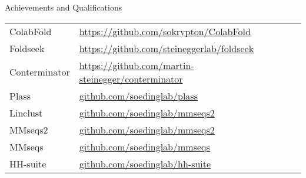 \documentclass{resume} %
\newenvironment{packed_itemize}{
\begin{itemize}
  \setlength{\itemsep}{3pt}
  \setlength{\parskip}{0pt}
  \setlength{\parsep}{0pt}
}{\end{itemize}}
\begin{document}
\begin{rSection}{Achievements and Qualifications}
\begin{tabular}{p{2.5cm}p{14.1cm}}
ColabFold  & \url{https://github.com/sokrypton/ColabFold} \\[1.mm]
Foldseek  & \url{https://github.com/steineggerlab/foldseek} \\[1.mm]
Conterminator & \url{https://github.com/martin-steinegger/conterminator} \\[1.mm]
Plass  &  \url{github.com/soedinglab/plass} \\[1.mm]
Linclust  &  \url{github.com/soedinglab/mmseqs2} \\[1.mm]
MMseqs2  &  \url{github.com/soedinglab/mmseqs2} \\[1.mm]
MMseqs  &  \url{github.com/soedinglab/mmseqs} \\[1.mm]
HH-suite  &  \url{github.com/soedinglab/hh-suite} \\[1.mm]
\end{tabular}
\end{rSection}



\newpage
\end{document}
